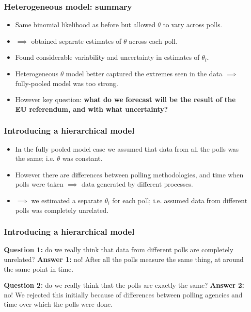 \documentclass[handout]{beamer}
\begin{document}
\begin{frame}
	\frametitle{Heterogeneous model: summary}
	
	\begin{itemize}
		\item<2-> Same binomial likelihood as before but allowed $\theta$ to vary across polls.
		\item<3-> $\implies$ obtained separate estimates of $\theta$ across each poll.
		\item<4-> Found considerable variability and uncertainty in estimates of $\theta_i$.
		\item<5-> Heterogeneous $\theta$ model better captured the extremes seen in the data $\implies$ fully-pooled model was too strong.
		\item<6-> However key question: \textbf{what do we forecast will be the result of the EU referendum, and with what uncertainty?}
	\end{itemize}
	
\end{frame}

\begin{frame}
	\frametitle{Introducing a hierarchical model}
	\begin{itemize}
		\item<2-> In the fully pooled model case we assumed that data from all the polls was the same; i.e. $\theta$ was constant.
		\item<3-> However there are differences between polling methodologies, and time when polls were taken $\implies$ data generated by different processes.
		\item<4-> $\implies$ we estimated a separate $\theta_i$ for each poll; i.e. assumed data from different polls was completely unrelated.
	\end{itemize}
	
\end{frame}

\begin{frame}
	\frametitle{Introducing a hierarchical model}
	 \textbf{Question 1:} do we really think that data from different polls are completely unrelated?
	\onslide<3-> \textbf{Answer 1:} no! After all the polls measure the same thing, at around the same point in time.
	
	\vspace{0.3cm}
	
	 \textbf{Question 2:} do we really think that the polls are exactly the same?
	\onslide<5-> \textbf{Answer 2:} no! We rejected this initially because of differences between polling agencies and time over which the polls were done.
	
\end{frame}
\end{document}
